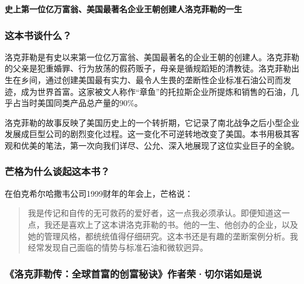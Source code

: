 \cleardoublepage
{}


\begin{BookSummaryBox}
\textbf{史上第一位亿万富翁、美国最著名企业王朝创建人洛克菲勒的一生}
\par
\end{BookSummaryBox}

\subsubsection*{这本书谈什么？}

洛克菲勒是有史以来第一位亿万富翁、美国最著名的企业王朝的创建人。洛克菲勒的父亲是犯重婚罪、行为放荡的假药贩子，母亲是循规蹈矩的清教徒。洛克菲勒出生在乡间，通过创建美国最有实力、最令人生畏的垄断性企业标准石油公司而发迹，成为世界首富。这家被文人称作“章鱼”的托拉斯企业所提炼和销售的石油，几乎占当时美国同类产品总产量的90\%。
\par

洛克菲勒的故事反映了美国历史上的一个转折期，它记录了南北战争之后小型企业发展成巨型公司的剧烈变化过程。这一变化不可逆转地改变了美国。本书用极其客观和优美的笔法，第一次向我们详尽、公允、深入地展现了这位实业巨子的全貌。
\par

\subsubsection*{芒格为什么谈起这本书？}

在伯克希尔哈撒韦公司1999财年的年会上，芒格说：
\par

\begin{quotation}
我是传记和自传的无可救药的爱好者，这一点我必须承认。即便知道这一点，我还是喜欢上了这本讲洛克菲勒的书。他的一生、他创办的企业，以及她的管理风格，都统统值得仔细研究。这本书还是有趣的垄断案例分析。我经常发现自己面临的情势与标准石油和微软迥异。
\par
\end{quotation}

\subsubsection*{《洛克菲勒传：全球首富的创富秘诀》作者荣·切尔诺如是说}

